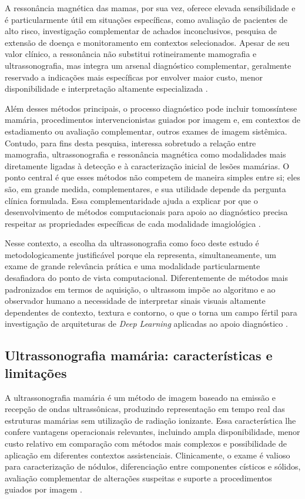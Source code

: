 \documentclass[tcc,capa]{texufpel}
\begin{document}
A ressonância magnética das mamas, por sua vez, oferece elevada sensibilidade e é particularmente útil em situações específicas, como avaliação de pacientes de alto risco, investigação complementar de achados inconclusivos, pesquisa de extensão de doença e monitoramento em contextos selecionados. Apesar de seu valor clínico, a ressonância não substitui rotineiramente mamografia e ultrassonografia, mas integra um arsenal diagnóstico complementar, geralmente reservado a indicações mais específicas por envolver maior custo, menor disponibilidade e interpretação altamente especializada \cite{NCIScreening2025,NCIBreastDiagnosis2025}.

Além desses métodos principais, o processo diagnóstico pode incluir tomossíntese mamária, procedimentos intervencionistas guiados por imagem e, em contextos de estadiamento ou avaliação complementar, outros exames de imagem sistêmica. Contudo, para fins desta pesquisa, interessa sobretudo a relação entre mamografia, ultrassonografia e ressonância magnética como modalidades mais diretamente ligadas à detecção e à caracterização inicial de lesões mamárias. O ponto central é que esses métodos não competem de maneira simples entre si; eles são, em grande medida, complementares, e sua utilidade depende da pergunta clínica formulada. Essa complementaridade ajuda a explicar por que o desenvolvimento de métodos computacionais para apoio ao diagnóstico precisa respeitar as propriedades específicas de cada modalidade imagiológica \cite{NCIScreening2025,INCADeteccaoPrecoce2022}.

Nesse contexto, a escolha da ultrassonografia como foco deste estudo é metodologicamente justificável porque ela representa, simultaneamente, um exame de grande relevância prática e uma modalidade particularmente desafiadora do ponto de vista computacional. Diferentemente de métodos mais padronizados em termos de aquisição, o ultrassom impõe ao algoritmo e ao observador humano a necessidade de interpretar sinais visuais altamente dependentes de contexto, textura e contorno, o que o torna um campo fértil para investigação de arquiteturas de \textit{Deep Learning} aplicadas ao apoio diagnóstico \cite{Trepanier2023,Dan2024}.

\subsection{Ultrassonografia mamária: características e limitações}

A ultrassonografia mamária é um método de imagem baseado na emissão e recepção de ondas ultrassônicas, produzindo representação em tempo real das estruturas mamárias sem utilização de radiação ionizante. Essa característica lhe confere vantagens operacionais relevantes, incluindo ampla disponibilidade, menor custo relativo em comparação com métodos mais complexos e possibilidade de aplicação em diferentes contextos assistenciais. Clinicamente, o exame é valioso para caracterização de nódulos, diferenciação entre componentes císticos e sólidos, avaliação complementar de alterações suspeitas e suporte a procedimentos guiados por imagem \cite{INCAParametrosMama,INCADiretrizesMama}.
\end{document}
